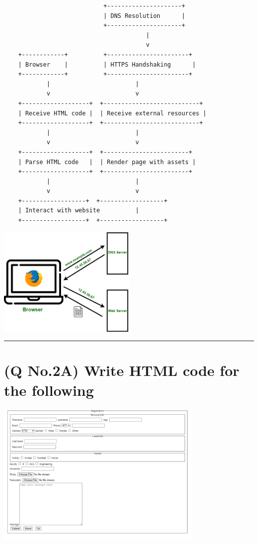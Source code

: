 \documentclass[11pt]{article}
\begin{document}
\begin{lstlisting}
                            +---------------------+
                            | DNS Resolution      |
                            +---------------------+
                                        |
                                        v
    +------------+          +-----------------------+
    | Browser    |          | HTTPS Handshaking      |
    +------------+          +-----------------------+
            |                        |
            v                        v
    +-------------------+  +---------------------------+
    | Receive HTML code |  | Receive external resources |
    +-------------------+  +---------------------------+
            |                        |
            v                        v
    +-------------------+  +------------------------+
    | Parse HTML code   |  | Render page with assets |
    +-------------------+  +------------------------+
            |                        |
            v                        v
    +------------------+  +------------------+
    | Interact with website          |
    +------------------+  +------------------+

\end{lstlisting}

\includegraphics[width=0.5\textwidth]{resources/qno1b.png}

\noindent\rule{\linewidth}{0.4pt}
\section{(Q No.2A) Write HTML code for the following}
\includegraphics[width=0.75\textwidth]{resources/qno2a.jpg}
\subparagraph{}

\end{document}
